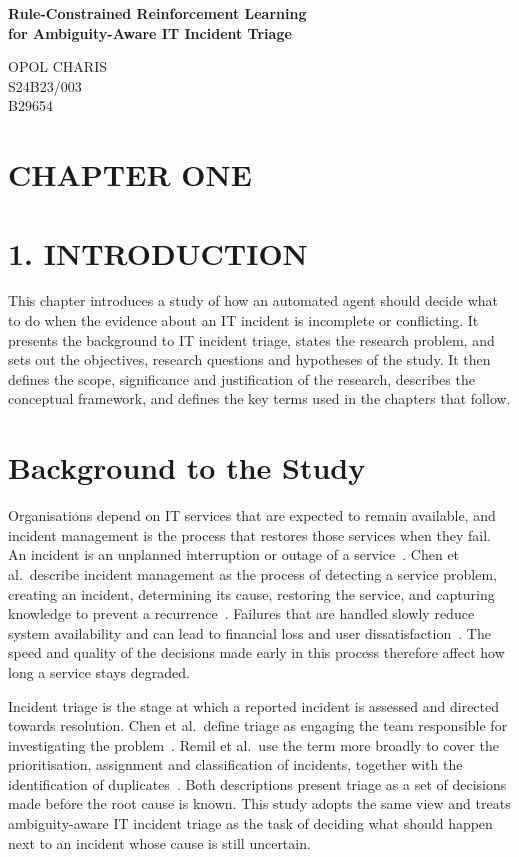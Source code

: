 \documentclass[12pt,a4paper]{article}
\begin{document}
\begin{center}
  {\LARGE\bfseries Rule-Constrained Reinforcement Learning\\for Ambiguity-Aware IT Incident Triage\par}
  \vspace{1.5em}
  {\large OPOL CHARIS\\
  S24B23/003\\
  B29654\par}
\end{center}
\vspace{1.5em}

\section*{CHAPTER ONE}

\section*{1. INTRODUCTION}

This chapter introduces a study of how an automated agent should decide what to do when the evidence about an IT incident is incomplete or conflicting. It presents the background to IT incident triage, states the research problem, and sets out the objectives, research questions and hypotheses of the study. It then defines the scope, significance and justification of the research, describes the conceptual framework, and defines the key terms used in the chapters that follow.

\section{Background to the Study}

Organisations depend on IT services that are expected to remain available, and incident management is the process that restores those services when they fail. An incident is an unplanned interruption or outage of a service~\cite{chen2020}. Chen et al.\ describe incident management as the process of detecting a service problem, creating an incident, determining its cause, restoring the service, and capturing knowledge to prevent a recurrence~\cite{chen2020}. Failures that are handled slowly reduce system availability and can lead to financial loss and user dissatisfaction~\cite{chen2020,remil2024}. The speed and quality of the decisions made early in this process therefore affect how long a service stays degraded.

Incident triage is the stage at which a reported incident is assessed and directed towards resolution. Chen et al.\ define triage as engaging the team responsible for investigating the problem~\cite{chen2020}. Remil et al.\ use the term more broadly to cover the prioritisation, assignment and classification of incidents, together with the identification of duplicates~\cite{remil2024}. Both descriptions present triage as a set of decisions made before the root cause is known. This study adopts the same view and treats ambiguity-aware IT incident triage as the task of deciding what should happen next to an incident whose cause is still uncertain.
\end{document}
